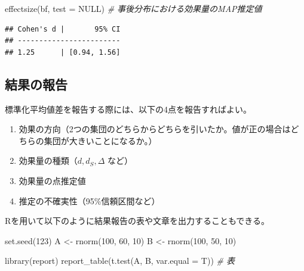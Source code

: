 \documentclass[
  ja=standard, xelatex, base=12pt]{bxjsreport}
\newenvironment{Shaded}{\begin{snugshade}}{\end{snugshade}}
\newcommand{\AttributeTok}[1]{\textcolor[rgb]{0.77,0.63,0.00}{#1}}
\newcommand{\CommentTok}[1]{\textcolor[rgb]{0.56,0.35,0.01}{\textit{#1}}}
\newcommand{\ConstantTok}[1]{\textcolor[rgb]{0.00,0.00,0.00}{#1}}
\newcommand{\DecValTok}[1]{\textcolor[rgb]{0.00,0.00,0.81}{#1}}
\newcommand{\FunctionTok}[1]{\textcolor[rgb]{0.00,0.00,0.00}{#1}}
\newcommand{\NormalTok}[1]{#1}
\newcommand{\OtherTok}[1]{\textcolor[rgb]{0.56,0.35,0.01}{#1}}
\providecommand{\tightlist}{%
  \setlength{\itemsep}{0pt}\setlength{\parskip}{0pt}}
\begin{document}
\begin{Shaded}
\begin{Highlighting}[]
\FunctionTok{effectsize}\NormalTok{(bf, }\AttributeTok{test =} \ConstantTok{NULL}\NormalTok{) }\CommentTok{\# 事後分布における効果量のMAP推定値}
\end{Highlighting}
\end{Shaded}

\begin{verbatim}
## Cohen's d |       95% CI
## ------------------------
## 1.25      | [0.94, 1.56]
\end{verbatim}

\hypertarget{ux7d50ux679cux306eux5831ux544a-1}{%
\subsection{結果の報告}\label{ux7d50ux679cux306eux5831ux544a-1}}

標準化平均値差を報告する際には、以下の4点を報告すればよい。

\begin{enumerate}
\def\labelenumi{\arabic{enumi}.}
\tightlist
\item
  効果の方向（2つの集団のどちらからどちらを引いたか。値が正の場合はどちらの集団が大きいことになるか。）
\item
  効果量の種類（\(d, d_S, \Delta\) など）
\item
  効果量の点推定値
\item
  推定の不確実性（95\%信頼区間など）
\end{enumerate}

Rを用いて以下のように結果報告の表や文章を出力することもできる。

\begin{Shaded}
\begin{Highlighting}[]
\FunctionTok{set.seed}\NormalTok{(}\DecValTok{123}\NormalTok{)}
\NormalTok{A }\OtherTok{\textless{}{-}} \FunctionTok{rnorm}\NormalTok{(}\DecValTok{100}\NormalTok{, }\DecValTok{60}\NormalTok{, }\DecValTok{10}\NormalTok{)}
\NormalTok{B }\OtherTok{\textless{}{-}} \FunctionTok{rnorm}\NormalTok{(}\DecValTok{100}\NormalTok{, }\DecValTok{50}\NormalTok{, }\DecValTok{10}\NormalTok{)}

\FunctionTok{library}\NormalTok{(report)}
\FunctionTok{report\_table}\NormalTok{(}\FunctionTok{t.test}\NormalTok{(A, B, }\AttributeTok{var.equal =}\NormalTok{ T)) }\CommentTok{\# 表}
\end{Highlighting}
\end{Shaded}
\end{document}
